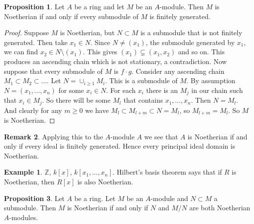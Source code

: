 \documentclass{article}
\newcommand{\Z}{\mathbb{Z}}
\newcommand{\rb}[1]{\left( #1 \right)}
\renewcommand{\sb}[1]{\left[ #1 \right]}
\theoremstyle{definition}\newtheorem{definition}{Definition}[section]
\theoremstyle{definition}\newtheorem{remark}[definition]{Remark}
\theoremstyle{definition}\newtheorem*{example}{Example}
\theoremstyle{definition}\newtheorem*{note}{Note}
\newtheorem{proposition}[definition]{Proposition}
\begin{document}
\begin{proposition}
Let $ A $ be a ring and let $ M $ be an $ A $-module. Then $ M $ is Noetherian if and only if every submodule of $ M $ is finitely generated.
\end{proposition}

\begin{proof}
Suppose $ M $ is Noetherian, but $ N \subset M $ is a submodule that is not finitely generated. Then take $ x_1 \in N $. Since $ N \ne \rb{x_1} $, the submodule generated by $ x_1 $, we can find $ x_2 \in N \setminus \rb{x_1} $. This gives $ \rb{x_1} \subsetneq \rb{x_1, x_2} $ and so on. This produces an ascending chain which is not stationary, a contradiction. Now suppose that every submodule of $ M $ is $ f \cdot g $. Consider any ascending chain $ M_1 \subset M_2 \subset \dots $. Let $ N = \cup_{i \ge 1} M_i $. This is a submodule of $ M $. By assumption $ N = \rb{x_1, \dots, x_n} $ for some $ x_i \in N $. For each $ x_i $ there is an $ M_j $ in our chain such that $ x_i \in M_j $. So there will be some $ M_l $ that contains $ x_1, \dots, x_n $. Then $ N = M_l $. And clearly for any $ m \ge 0 $ we have $ M_l \subset M_{l + m} \subset N = M_l $, so $ M_{l + m} = M_l $. So $ M $ is Noetherian.
\end{proof}

\begin{remark}
Applying this to the $ A $-module $ A $ we see that $ A $ is Noetherian if and only if every ideal is finitely generated. Hence every principal ideal domain is Noetherian.
\end{remark}

\begin{example}
$ \Z $, $ k\sb{x} $, $ k\sb{x_1, \dots, x_n} $. Hilbert's basis theorem says that if $ R $ is Noetherian, then $ R\sb{x} $ is also Noetherian.
\end{example}

\begin{proposition}
\label{prop:10.4}
Let $ A $ be a ring. Let $ M $ be an $ A $-module and $ N \subset M $ a submodule. Then $ M $ is Noetherian if and only if $ N $ and $ M / N $ are both Noetherian $ A $-modules.
\end{proposition}
\end{document}
